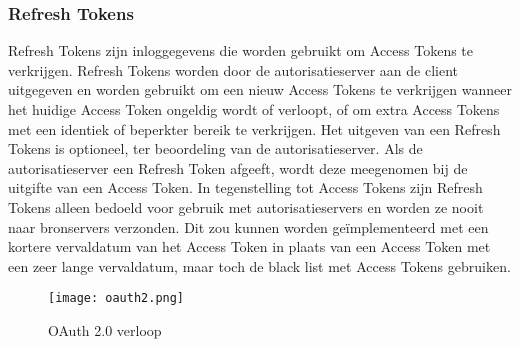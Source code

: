 \subsubsection{Refresh Tokens}%
\label{subsubsec:refresh-tokens}
Refresh Tokens zijn inloggegevens die worden gebruikt om Access Tokens te verkrijgen. Refresh Tokens worden door de autorisatieserver aan de client uitgegeven en worden gebruikt om een nieuw Access Tokens te verkrijgen wanneer het huidige Access Token ongeldig wordt of verloopt, of om extra Access Tokens met een identiek of beperkter bereik te verkrijgen. Het uitgeven van een Refresh Tokens is optioneel, ter beoordeling van de autorisatieserver. Als de autorisatieserver een Refresh Token afgeeft, wordt deze meegenomen bij de uitgifte van een Access Token. In tegenstelling tot Access Tokens zijn Refresh Tokens alleen bedoeld voor gebruik met autorisatieservers en worden ze nooit naar bronservers verzonden.
Dit zou kunnen worden geïmplementeerd met een kortere vervaldatum van het Access Token in plaats van een Access Token met een zeer lange vervaldatum, maar toch de black list met Access Tokens gebruiken.
\begin{figure}[h]
  \centering
  \texttt{[image: oauth2.png]}
  \caption{OAuth 2.0 verloop}
  \label{fig:example1}
\end{figure}

